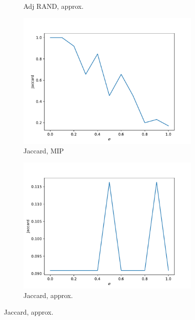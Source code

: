 \documentclass{beamer}
\begin{document}
\begin{frame}[c]
\begin{figure}
\begin{center}
\begin{subfigure}[b]{0.3\textwidth}
				\caption{Adj RAND, approx.}
				\label{fig:adj-rand-appr1}
			\end{subfigure}
		\end{center}
		\begin{center}
			\begin{subfigure}[b]{0.3\textwidth}
				\centering
				\includegraphics[width=\textwidth]{out/synthetic_exact/model2_sigmas_jaccard.pdf}
				\caption{Jaccard, MIP}
				\label{fig:out/synthetic_exact/model2_sigmas_jaccard.pdf}
			\end{subfigure}
			\begin{subfigure}[b]{0.3\textwidth}
				\centering
				\includegraphics[width=\textwidth]{out/synthetic_appr/model2_sigmas_jaccard.pdf}
				\caption{Jaccard, approx.}
				\label{fig:jacc-appr1}
			\end{subfigure}
		\end{center}
	\end{figure}

\end{frame}
\end{document}
